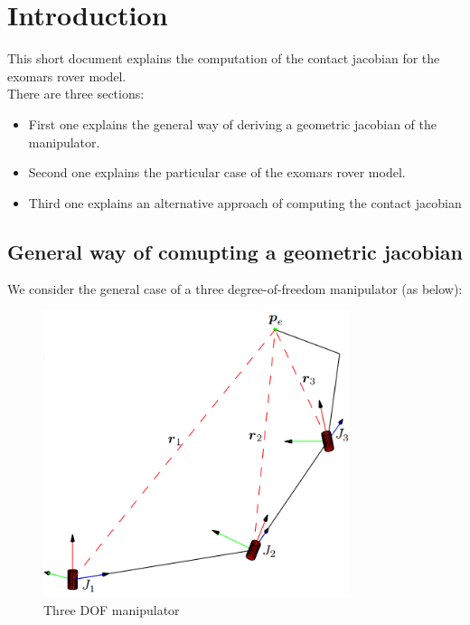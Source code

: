 \documentclass[a4paper]{article}
\begin{document}
\setcounter{page}{1}



\section{Introduction}

This short document explains the computation of the contact jacobian for the exomars rover model. \\

\noindent There are three sections:

\begin{itemize}
  \item First one explains the general way of deriving a geometric jacobian of the manipulator.
  \item Second one explains the particular case of the exomars rover model.
  \item Third one explains an alternative approach of computing the contact jacobian
\end{itemize}

\subsection{General way of comupting a geometric jacobian}

\noindent We consider the general case of a three degree-of-freedom manipulator (as below):

\begin{figure}[h!]
  \centering
    \includegraphics[width=0.8\textwidth]{jacobian}
  \caption{Three DOF manipulator}
\end{figure}
\end{document}
